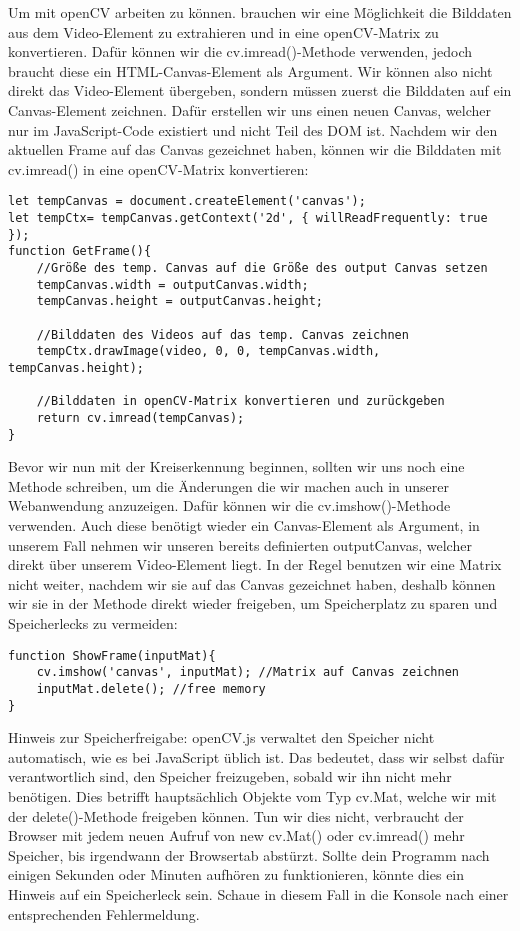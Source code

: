 Um mit openCV arbeiten zu können. brauchen wir eine Möglichkeit die Bilddaten aus dem Video-Element zu extrahieren und in eine openCV-Matrix zu konvertieren. Dafür können wir die cv.imread()-Methode verwenden, jedoch braucht diese ein HTML-Canvas-Element als Argument. Wir können also nicht direkt das Video-Element übergeben, sondern müssen zuerst die Bilddaten auf ein Canvas-Element zeichnen. Dafür erstellen wir uns einen neuen Canvas, welcher nur im JavaScript-Code existiert und nicht Teil des DOM ist. Nachdem wir den aktuellen Frame auf das Canvas gezeichnet haben, können wir die Bilddaten mit cv.imread() in eine openCV-Matrix konvertieren:

\begin{lstlisting}[style=JavaScript]
let tempCanvas = document.createElement('canvas');
let tempCtx= tempCanvas.getContext('2d', { willReadFrequently: true });
function GetFrame(){
    //Größe des temp. Canvas auf die Größe des output Canvas setzen
    tempCanvas.width = outputCanvas.width;
    tempCanvas.height = outputCanvas.height;

    //Bilddaten des Videos auf das temp. Canvas zeichnen
    tempCtx.drawImage(video, 0, 0, tempCanvas.width, tempCanvas.height);

    //Bilddaten in openCV-Matrix konvertieren und zurückgeben
    return cv.imread(tempCanvas);
}
\end{lstlisting}

Bevor wir nun mit der Kreiserkennung beginnen, sollten wir uns noch eine Methode schreiben, um die Änderungen die wir machen auch in unserer Webanwendung anzuzeigen. Dafür können wir die cv.imshow()-Methode verwenden. Auch diese benötigt wieder ein Canvas-Element als Argument, in unserem Fall nehmen wir unseren bereits definierten outputCanvas, welcher direkt über unserem Video-Element liegt. In der Regel benutzen wir eine Matrix nicht weiter, nachdem wir sie auf das Canvas gezeichnet haben, deshalb können wir sie in der Methode direkt wieder freigeben, um Speicherplatz zu sparen und Speicherlecks zu vermeiden:

\begin{lstlisting}[style=JavaScript]
function ShowFrame(inputMat){
    cv.imshow('canvas', inputMat); //Matrix auf Canvas zeichnen
    inputMat.delete(); //free memory
}
\end{lstlisting}

Hinweis zur Speicherfreigabe: openCV.js verwaltet den Speicher nicht automatisch, wie es bei JavaScript üblich ist. Das bedeutet, dass wir selbst dafür verantwortlich sind, den Speicher freizugeben, sobald wir ihn nicht mehr benötigen. Dies betrifft hauptsächlich Objekte vom Typ cv.Mat, welche wir mit der delete()-Methode freigeben können. Tun wir dies nicht, verbraucht der Browser mit jedem neuen Aufruf von new cv.Mat() oder cv.imread() mehr Speicher, bis irgendwann der Browsertab abstürzt. Sollte dein Programm nach einigen Sekunden oder Minuten aufhören zu funktionieren, könnte dies ein Hinweis auf ein Speicherleck sein. Schaue in diesem Fall in die Konsole nach einer entsprechenden Fehlermeldung.

